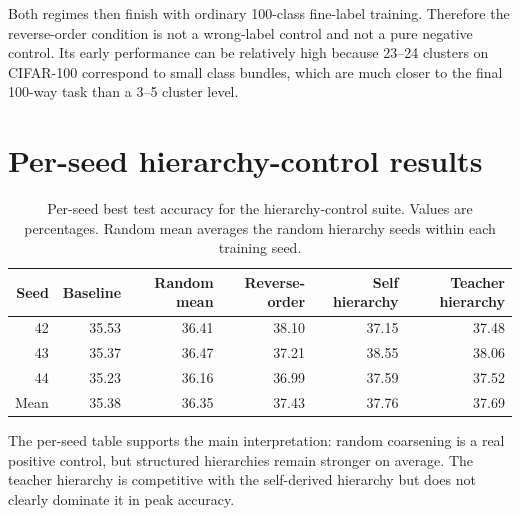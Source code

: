 Both regimes then finish with ordinary 100-class fine-label training. Therefore
the reverse-order condition is not a wrong-label control and not a pure negative
control. Its early performance can be relatively high because 23--24 clusters on
CIFAR-100 correspond to small class bundles, which are much closer to the final
100-way task than a 3--5 cluster level.

\begingroup
\renewcommand{\addcontentsline}[3]{}
\section{Per-seed hierarchy-control results}
\endgroup

\begin{table}[h]
\centering
\small
\begin{tabular}{rrrrrr}
\toprule
Seed & Baseline & Random mean & Reverse-order & Self hierarchy & Teacher hierarchy \\
\midrule
42 & 35.53 & 36.41 & 38.10 & 37.15 & 37.48 \\
43 & 35.37 & 36.47 & 37.21 & 38.55 & 38.06 \\
44 & 35.23 & 36.16 & 36.99 & 37.59 & 37.52 \\
\midrule
Mean & 35.38 & 36.35 & 37.43 & 37.76 & 37.69 \\
\bottomrule
\end{tabular}
\caption{Per-seed best test accuracy for the hierarchy-control suite. Values are
percentages. Random mean averages the random hierarchy seeds within each
training seed.}
\label{tab:app-teacher-control-seeds-compact}
\end{table}

The per-seed table supports the main interpretation: random coarsening is a real
positive control, but structured hierarchies remain stronger on average. The
teacher hierarchy is competitive with the self-derived hierarchy but does not
clearly dominate it in peak accuracy.
